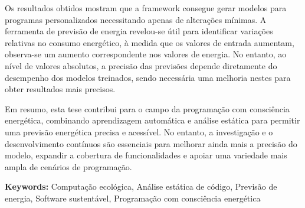 Os resultados obtidos mostram que a framework consegue gerar modelos para programas personalizados necessitando apenas de alterações mínimas. A ferramenta de previsão de energia revelou-se útil para identificar variações relativas no consumo energético, à medida que os valores de entrada aumentam, observa-se um aumento correspondente nos valores de energia. No entanto, ao nível de valores absolutos, a precisão das previsões depende diretamente do desempenho dos modelos treinados, sendo necessária uma melhoria nestes para obter resultados mais precisos.

Em resumo, esta tese contribui para o campo da programação com consciência energética, combinando aprendizagem automática e análise estática para permitir uma previsão energética precisa e acessível. No entanto, a investigação e o desenvolvimento contínuos são essenciais para melhorar ainda mais a precisão do modelo, expandir a cobertura de funcionalidades e apoiar uma variedade mais ampla de cenários de programação.


\vfill

\begin{flushleft}
\textbf{Keywords:}
Computação ecológica, Análise estática de código, Previsão de energia, Software sustentável, Programação com consciência energética
\end{flushleft}

{}